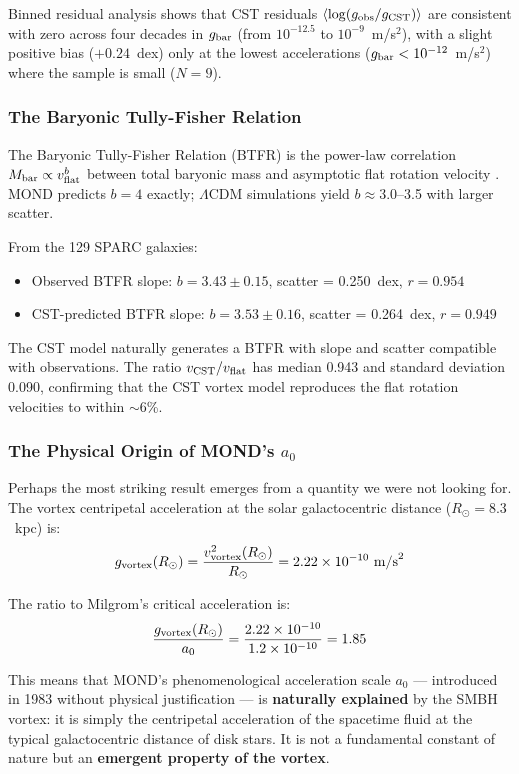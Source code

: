 \documentclass[10pt,a4paper]{article}
\providecommand{\tightlist}{\setlength{\itemsep}{0pt}\setlength{\parskip}{0pt}}
\begin{document}
Binned residual analysis shows that CST residuals $\langle \log(g_{\rm obs}/g_{\rm CST}) \rangle$ are consistent with zero across four decades in $g_{\rm bar}$ (from $10^{-12.5}$ to $10^{-9}$~m/s$^2$), with a slight positive bias ($+0.24$~dex) only at the lowest accelerations ($g_{\rm bar} < 10^{-12}$~m/s$^2$) where the sample is small ($N = 9$).

\subsubsection{The Baryonic Tully-Fisher Relation}

The Baryonic Tully-Fisher Relation (BTFR) is the power-law correlation $M_{\rm bar} \propto v_{\rm flat}^b$ between total baryonic mass and asymptotic flat rotation velocity \cite{McGaugh2016,Lelli2016}. MOND predicts $b = 4$ exactly; $\Lambda$CDM simulations yield $b \approx 3.0$--3.5 with larger scatter.

From the 129 SPARC galaxies:
\begin{itemize}
\tightlist
\item Observed BTFR slope: $b = 3.43 \pm 0.15$, scatter = 0.250~dex, $r = 0.954$
\item CST-predicted BTFR slope: $b = 3.53 \pm 0.16$, scatter = 0.264~dex, $r = 0.949$
\end{itemize}

The CST model naturally generates a BTFR with slope and scatter compatible with observations. The ratio $v_{\rm CST}/v_{\rm flat}$ has median 0.943 and standard deviation 0.090, confirming that the CST vortex model reproduces the flat rotation velocities to within $\sim$6\%.

\subsubsection{The Physical Origin of MOND's $a_0$}

Perhaps the most striking result emerges from a quantity we were not looking for. The vortex centripetal acceleration at the solar galactocentric distance ($R_\odot = 8.3$~kpc) is:
\[g_{\rm vortex}(R_\odot) = \frac{v_{\rm vortex}^2(R_\odot)}{R_\odot} = 2.22 \times 10^{-10}~{\rm m/s}^2\]

The ratio to Milgrom's critical acceleration is:
\[\frac{g_{\rm vortex}(R_\odot)}{a_0} = \frac{2.22 \times 10^{-10}}{1.2 \times 10^{-10}} = 1.85\]

This means that MOND's phenomenological acceleration scale $a_0$ --- introduced in 1983 without physical justification --- is \textbf{naturally explained} by the SMBH vortex: it is simply the centripetal acceleration of the spacetime fluid at the typical galactocentric distance of disk stars. It is not a fundamental constant of nature but an \textbf{emergent property of the vortex}.
\end{document}
